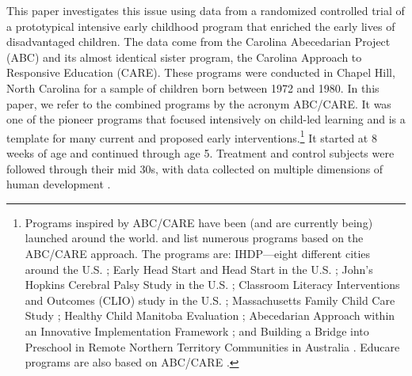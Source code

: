This paper investigates this issue using data from a randomized controlled trial of a prototypical intensive early childhood program that enriched the early lives of disadvantaged children. The data come from the Carolina Abecedarian Project (ABC) and its almost identical sister program, the Carolina Approach to Responsive Education (CARE). These programs were conducted in Chapel Hill, North Carolina for a sample of children born between 1972 and 1980. In this paper, we refer to the combined programs by the acronym ABC/CARE. It was one of the pioneer programs that focused intensively on child-led learning and is a template for many current and proposed early interventions.\footnote{Programs inspired by ABC/CARE have been (and are currently being) launched around the world. \citet{Sparling_2010_Highlights} and \citet{Ramey_Ramey_Lanzi_2014_Interventions} list numerous programs based on the ABC/CARE approach. The programs are: IHDP---eight different cities around the U.S. \citep{Spiker-etal_1997_Helping}; Early Head Start and Head Start in the U.S. \citep{Schneider_McDonald-eds_2007_Scale-Up_Vol-1}; John's Hopkins Cerebral Palsy Study in the U.S. \citep{Sparling_2010_Highlights}; Classroom Literacy Interventions and Outcomes (CLIO) study in the U.S. \citep{Sparling_2010_Highlights}; Massachusetts Family Child Care Study \citep{Collins_etal_2010_Massachusetts-Study}; Healthy Child Manitoba Evaluation \citep{Healthy_Child_Manitoba_2015_Starting-Early}; Abecedarian Approach within an Innovative Implementation Framework \citep{Jensen_Nielsen_2016_ABC-Programme-Pilot}; and Building a Bridge into Preschool in Remote Northern Territory Communities in Australia \citep{UMonash_Dataset_2015_URL}. Educare programs are also based on ABC/CARE \citep{Educare_2014_Research_Agenda,Yazejian_Bryant_2012_Educare}.} It started at 8 weeks of age and continued through age 5. Treatment and control subjects were followed through their mid 30s, with data collected on multiple dimensions of human development \citep{Ramey_Campbell_1991_childreninpoverty}. 

